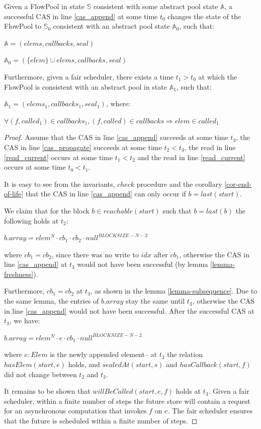 \documentclass[runningheads,a4paper]{llncs}
\begin{document}
\begin{lemma}\label{lemma-append}
Given a FlowPool in state $\mathbb{S}$ consistent with some abstract pool state $\mathbb{A}$, 
a successful CAS in line \ref{cas_append} at some time $t_0$ changes the state of the FlowPool 
to $\mathbb{S}_0$ consistent with an abstract pool state $\mathbb{A}_0$, such that:

$\mathbb{A} = (elems, callbacks, seal)$

$\mathbb{A}_0 = (\{elem\} \cup elems, callbacks, seal)$

Furthermore, given a fair scheduler, there exists a time $t_1 > t_0$ at which the FlowPool 
is consistent with an abstract pool in state $\mathbb{A}_1$, such that:

$\mathbb{A}_1 = (elems_1, callbacks_1, seal_1)$, where:

$\forall (f, called_1) \in callbacks_1, (f, called) \in callbacks \Rightarrow elem \in called_1$
\end{lemma}

\begin{proof}
Assume that the CAS in line \ref{cas_append} succeeds at some time
$t_3$, the CAS in line \ref{cas_propagate} succeeds at some time $t_2 <
t_3$, the read in line \ref{read_current} occurs at some time $t_1 <
t_2$ and the read in line \ref{read_current} occurs at some time $t_0
< t_1$.

It is easy to see from the invariants, $check$ procedure and the
corollary \ref{cor-end-of-life} that the CAS in line \ref{cas_append} can only
occur if $b = last(start)$.

We claim that for the block $b \in reachable(start)$ such that $b = last(b)$ the
following holds at $t_2$:

$b.array = elem^N \cdot cb_1 \cdot cb_2 \cdot null^{BLOCKSIZE - N - 2}$

where $cb_1 = cb_2$, since there was no write to $idx$ after $cb_1$, otherwise the
CAS in line \ref{cas_append} at $t_3$ would not have been successful
(by lemma \ref{lemma-freshness}).

Furthermore, $cb_1 = cb_2$ at $t_3$, as shown in the lemma
\ref{lemma-subsequence}. Due to the same lemma, the entries of
$b.array$ stay the same until $t_3$, otherwise the CAS in line
\ref{cas_append} would not have been successful.
After the successful CAS at $t_3$, we have:

$b.array = elem^N \cdot e \cdot cb_1 \cdot null^{BLOCKSIZE - N - 2}$

where $e: Elem$ is the newly appended element-- at $t_3$ the relation
$hasElem(start, e)$ holds, and $sealedAt(start, s)$ and $hasCallback(start,
f)$ did not change between $t_2$ and $t_3$.

It remains to be shown that $willBeCalled(start, e, f)$ holds at $t_3$.
Given a fair scheduler, within a finite number of steps the
future store will contain a request for an asynchronous computation
that invokes $f$ on $e$. The fair scheduler ensures that the future is
scheduled within a finite number of steps.
\end{proof}
\end{document}
